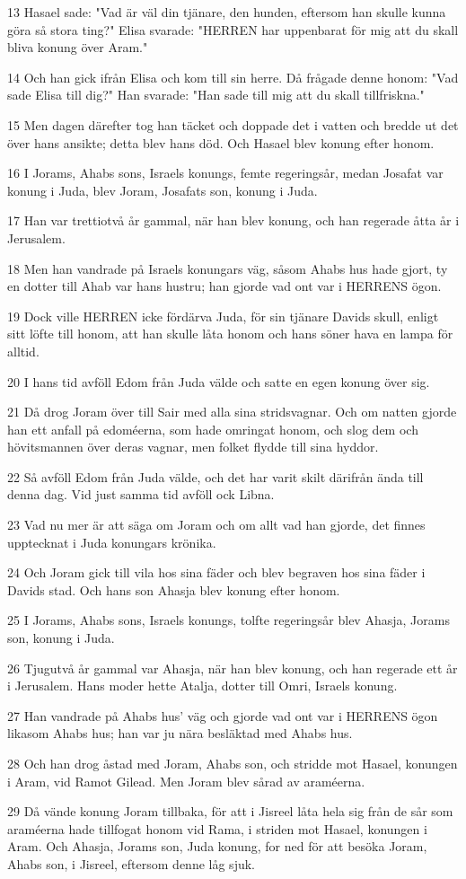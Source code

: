 \par 13 Hasael sade: "Vad är väl din tjänare, den hunden, eftersom han skulle kunna göra så stora ting?" Elisa svarade: "HERREN har uppenbarat för mig att du skall bliva konung över Aram."
\par 14 Och han gick ifrån Elisa och kom till sin herre. Då frågade denne honom: "Vad sade Elisa till dig?" Han svarade: "Han sade till mig att du skall tillfriskna."
\par 15 Men dagen därefter tog han täcket och doppade det i vatten och bredde ut det över hans ansikte; detta blev hans död. Och Hasael blev konung efter honom.
\par 16 I Jorams, Ahabs sons, Israels konungs, femte regeringsår, medan Josafat var konung i Juda, blev Joram, Josafats son, konung i Juda.
\par 17 Han var trettiotvå år gammal, när han blev konung, och han regerade åtta år i Jerusalem.
\par 18 Men han vandrade på Israels konungars väg, såsom Ahabs hus hade gjort, ty en dotter till Ahab var hans hustru; han gjorde vad ont var i HERRENS ögon.
\par 19 Dock ville HERREN icke fördärva Juda, för sin tjänare Davids skull, enligt sitt löfte till honom, att han skulle låta honom och hans söner hava en lampa för alltid.
\par 20 I hans tid avföll Edom från Juda välde och satte en egen konung över sig.
\par 21 Då drog Joram över till Sair med alla sina stridsvagnar. Och om natten gjorde han ett anfall på edoméerna, som hade omringat honom, och slog dem och hövitsmannen över deras vagnar, men folket flydde till sina hyddor.
\par 22 Så avföll Edom från Juda välde, och det har varit skilt därifrån ända till denna dag. Vid just samma tid avföll ock Libna.
\par 23 Vad nu mer är att säga om Joram och om allt vad han gjorde, det finnes upptecknat i Juda konungars krönika.
\par 24 Och Joram gick till vila hos sina fäder och blev begraven hos sina fäder i Davids stad. Och hans son Ahasja blev konung efter honom.
\par 25 I Jorams, Ahabs sons, Israels konungs, tolfte regeringsår blev Ahasja, Jorams son, konung i Juda.
\par 26 Tjugutvå år gammal var Ahasja, när han blev konung, och han regerade ett år i Jerusalem. Hans moder hette Atalja, dotter till Omri, Israels konung.
\par 27 Han vandrade på Ahabs hus' väg och gjorde vad ont var i HERRENS ögon likasom Ahabs hus; han var ju nära besläktad med Ahabs hus.
\par 28 Och han drog åstad med Joram, Ahabs son, och stridde mot Hasael, konungen i Aram, vid Ramot Gilead. Men Joram blev sårad av araméerna.
\par 29 Då vände konung Joram tillbaka, för att i Jisreel låta hela sig från de sår som araméerna hade tillfogat honom vid Rama, i striden mot Hasael, konungen i Aram. Och Ahasja, Jorams son, Juda konung, for ned för att besöka Joram, Ahabs son, i Jisreel, eftersom denne låg sjuk.

